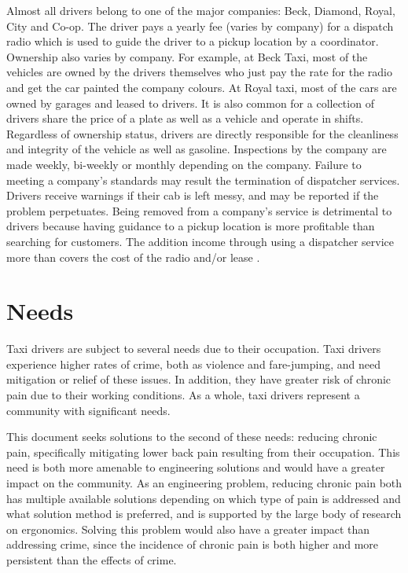 \documentclass[11pt]{article}
\begin{document}
Almost all drivers belong to one of the major companies: Beck, Diamond, Royal, City and
Co-op. The driver pays a yearly fee (varies by company) for a dispatch radio which is used to guide the 
driver to a pickup location by a coordinator. Ownership also varies by company. For example, 
at Beck Taxi, most of the vehicles are owned by the drivers themselves who just pay the 
rate for the radio and get the car painted the company colours. At Royal taxi, most of the 
cars are owned by garages and leased to drivers. It is also common for a collection of 
drivers share the price of a plate as well as a vehicle and operate in shifts. Regardless of   
ownership status, drivers are directly responsible for the cleanliness and integrity of the vehicle as well as gasoline. 
Inspections by the company are made weekly, bi-weekly or monthly depending on the company. 
Failure to meeting a company's standards may result the termination of dispatcher services. Drivers receive 
warnings if their cab is left messy, and may be reported if the problem perpetuates. Being removed from
a company's service is detrimental to drivers because having guidance to a pickup location
is more profitable than searching for customers. The addition income through using a dispatcher 
service more than covers the cost of the radio and/or lease \cite{thestar2012, Gowder2013}.
\section{Needs}
\label{sec:needs}
Taxi drivers are subject to several needs due to their
occupation. Taxi drivers experience higher rates of crime, both as
violence and fare-jumping\cite{policeverywherejustnowhere}, and need
mitigation or relief of these issues. In
addition, they have greater risk of chronic pain due to their working
conditions\cite{ODrivers@Risk,KneePain,POSTULATED}. As a whole, taxi
drivers represent a community with significant needs. 

This document seeks solutions to the second of these needs: reducing
chronic pain, specifically mitigating lower back pain resulting from
their occupation. This need is both more amenable to engineering solutions
and would have a greater impact on the community. As an engineering
problem, reducing chronic pain both has multiple available solutions
depending on which type of pain is addressed and what solution method
is preferred, and is supported by the large body of research on
ergonomics. Solving this problem would also have a greater impact than
addressing crime, since the incidence of chronic pain is both higher
and more persistent than the effects of crime.
\end{document}
